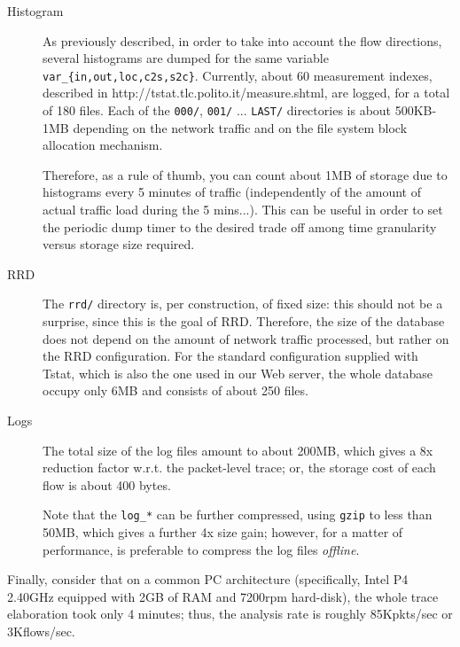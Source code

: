 \documentclass[11pt]{article}
\begin{document}
\begin{description}

\item[{Histogram}] \mbox{}

As previously described, in order to take into account the flow directions,
several histograms are dumped for the same variable \texttt{var\_\{in,out,loc,c2s,s2c\}}.
Currently, about 60 measurement indexes, described in 
\textsf{http://tstat.tlc.polito.it/measure.shtml},  are logged, for a total
of 180 files. Each of the \texttt{000/}, \texttt{001/} ... \texttt{LAST/} directories is about
500KB-1MB depending on the network traffic and on the file system block
allocation mechanism.



Therefore,  as a rule of thumb, you can count about 1MB of storage due to
histograms every 5 minutes of traffic (independently of the amount of actual
traffic load during the 5 mins...). This can be useful in order to set the
periodic dump timer to the desired trade off among time granularity versus
storage size  required.


\item[{RRD}] \mbox{}

The \texttt{rrd/} directory is, per construction, of fixed size: this should not be a
surprise, since this is the goal of RRD. Therefore, the size of the database
does not depend on the amount of network traffic processed, but rather on the
RRD configuration. For the standard configuration supplied with Tstat, which is
also the one used in our Web server, the whole database occupy only 6MB and
consists of about 250 files.


\item[{Logs}] \mbox{}

The total size of the log files amount to about 200MB, which 
gives  a 8x reduction factor w.r.t. the packet-level trace; or,
the storage cost of each flow is about 400 bytes.



Note that the \texttt{log\_*} can be further compressed, using \texttt{gzip}
to less than 50MB, which gives a further 4x size gain; 
however, for a matter of performance, is preferable 
to compress the log files \textit{offline}.

\end{description}


Finally, consider that on a common PC architecture (specifically,
Intel P4 2.40GHz equipped with 2GB of RAM and 7200rpm hard-disk),
the whole trace elaboration took only 4 minutes; thus, the 
analysis rate is roughly 85Kpkts/sec or 3Kflows/sec.
\end{document}
